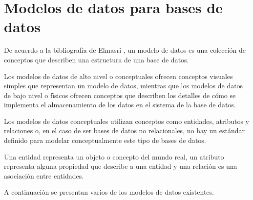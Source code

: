\section{Modelos de datos para bases de datos}
De acuerdo a la bibliografía de Elmasri \cite{ramez_elmasri_fundamentos_nodate}, un modelo de datos es una colección de conceptos que describen una estructura de una base de datos. 


Los modelos de datos de alto nivel o conceptuales ofrecen conceptos visuales simples que representan un modelo de datos, mientras que los modelos de datos de bajo nivel o físicos ofrecen conceptos que describen los detalles de cómo se implementa el almacenamiento de los datos en el sistema de la base de datos.


Los modelos de datos conceptuales utilizan conceptos como entidades, atributos y relaciones o, en el caso de ser bases de datos no relacionales, no hay un estándar definido para modelar conceptualmente este tipo de bases de datos.


Una entidad representa un objeto o concepto del mundo real, un atributo representa alguna propiedad que describe a una entidad y una relación es una asociación entre entidades.


A continuación se presentan varios de los modelos de datos existentes.